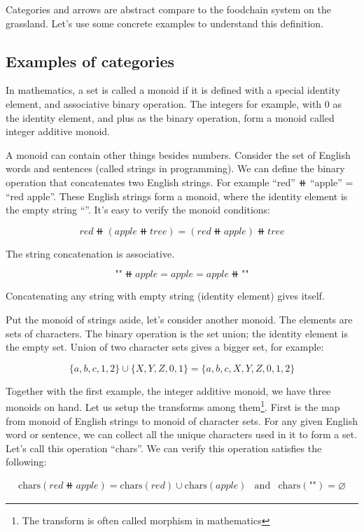 \documentclass[b5paper]{article}
\begin{document}
Categories and arrows are abstract compare to the foodchain system on the grassland. Let's use some concrete examples to understand this definition.

\subsection{Examples of categories}

In mathematics, a set is called a monoid if it is defined with a special identity element, and associative binary operation. The integers for example, with 0 as the identity element, and plus as the binary operation, form a monoid called integer additive monoid.

A monoid can contain other things besides numbers. Consider the set of English words and sentences (called strings in programming). We can define the binary operation that concatenates two English strings. For example ``red'' $\doubleplus$ ``apple'' = ``red apple''. These English strings form a monoid, where the identity element is the empty string ``''. It's easy to verify the monoid conditions:

\[
red \doubleplus (apple \doubleplus tree) = (red \doubleplus apple) \doubleplus tree
\]

The string concatenation is associative.

\[
\texttt{""} \doubleplus apple = apple = apple \doubleplus \texttt{""}
\]

Concatenating any string with empty string (identity element) gives itself.

Put the monoid of strings aside, let's consider another monoid. The elements are sets of characters. The binary operation is the set union; the identity element is the empty set. Union of two character sets gives a bigger set, for example:

\[
\{a, b, c, 1, 2\} \cup \{X, Y, Z, 0, 1\} = \{a, b, c, X, Y, Z, 0, 1, 2\}
\]

Together with the first example, the integer additive monoid, we have three monoids on hand. Let us setup the transforms among them\footnote{The transform is often called morphism in mathematics}. First is the map from monoid of English strings to monoid of character sets. For any given English word or sentence, we can collect all the unique characters used in it to form a set. Let's call this operation ``chars''. We can verify this operation satisfies the following:

\[
\begin{array}{rcl}
\text{chars}(red \doubleplus apple) = \text{chars}(red) \cup \text{chars}(apple) & \text{and} & \text{chars}(\texttt{""}) = \varnothing
\end{array}
\]
\end{document}
